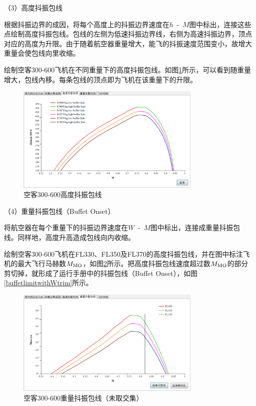 \documentclass[a4paper,punct,space,heading=true,AutoFakeBold]{ctexrep}
\begin{document}
（3）高度抖振包线

根据抖振边界的成因，将每个高度上的抖振边界速度在$h$\ -\ $M$图中标出，连接这些点绘制高度抖振包线。包线的左侧为低速抖振边界线，右侧为高速抖振边界，顶点对应的高度为升限。由于随着航空器重量增大，能飞的抖振速度范围变小，故增大重量会使包线向里收缩。

绘制空客300-600飞机在不同重量下的高度抖振包线。如图\ref{buffetlimitwithh}所示，可以看到随重量增大，包线內移。每条包线的顶点即为飞机在该重量下的升限。

\begin{figure}[h]
	\centering
	\includegraphics[width=0.8\textwidth]{pic/buffetlimitwithh.eps}\hspace{30pt}
	\caption{空客300-600高度抖振包线}\label{buffetlimitwithh}
\end{figure}



（4）重量抖振包线（Buffet Onset）

将航空器在每个重量下的抖振边界速度在$W$\ -\ $M$图中标出，连接成重量抖振包线。同样地，高度升高造成包线向内收缩。

绘制空客300-600飞机在FL330、FL350及FL370的高度抖振包线，并在图中标注飞机的最大飞行马赫数$M_{\rm MO}$，如图\ref{buffetlimitwithWwithouttrim}所示。把高度抖振包线速度超过数$M_{\rm MO}$的部分剪切掉，就形成了运行手册中的抖振包线（Buffet Onset），如图\ref{buffetlimitwithWtrim}所示。

\begin{figure}[h]
	\centering
	\includegraphics[width=0.8\textwidth]{pic/buffetlimitwithWwithouttrim.eps}\hspace{30pt}
	\caption{空客300-600重量抖振包线（未取交集）}\label{buffetlimitwithWwithouttrim}
\end{figure}
\end{document}
